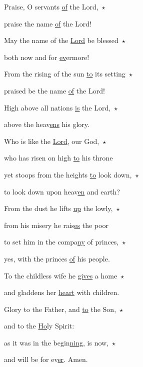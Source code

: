 \noindent Praise, O servants \uline{of} the Lord,~$\star$~\nopagebreak

praise the name \uline{of} the Lord!

\noindent May the name of the \uline{Lord} be blessed~$\star$~\nopagebreak

both now and for \uline{ev}ermore!

\noindent From the rising of the sun \uline{to} its setting~$\star$~\nopagebreak

praised be the name \uline{of} the Lord!

\noindent High above all nations \uline{is} the Lord,~$\star$~\nopagebreak

above the heav\uline{ens} his glory.

\noindent Who is like the \uline{Lord}, our God,~$\star$~\nopagebreak

who has risen on high \uline{to} his throne

\noindent yet stoops from the heights \uline{to} look down,~$\star$~\nopagebreak

to look down upon heav\uline{en} and earth?

\noindent From the dust he lifts \uline{up} the lowly,~$\star$~\nopagebreak

from his misery he rais\uline{es} the poor

\noindent to set him in the compa\uline{ny} of princes,~$\star$~\nopagebreak

yes, with the princes \uline{of} his people.

\noindent To the childless wife he \uline{gives} a home~$\star$~\nopagebreak

and gladdens her \uline{heart} with children.

\noindent Glory to the Father, and \uline{to} the Son,~$\star$~\nopagebreak

and to the \uline{Ho}ly Spirit:

\noindent as it was in the begin\uline{ning}, is now,~$\star$~\nopagebreak

and will be for ev\uline{er}. Amen.
